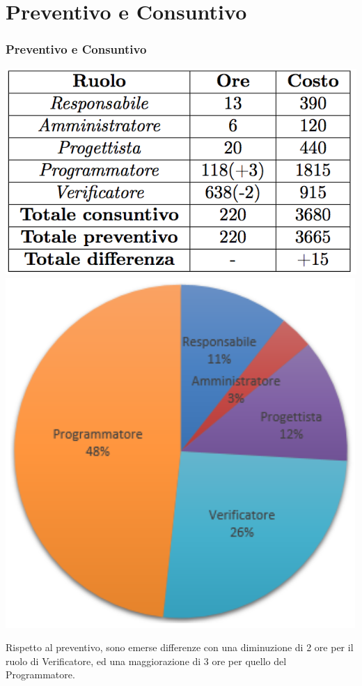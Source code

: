 \section{Preventivo e Consuntivo}
\begin{frame}
  \frametitle{Preventivo e Consuntivo}
  \begin{center}
  	\includegraphics[scale=0.5]{img/prevCD}
  	\includegraphics[scale=0.4]{img/cakeCD}
  \end{center}
Rispetto al preventivo, sono emerse differenze con una diminuzione di 2 ore per il ruolo di Verificatore, ed una maggiorazione di 3 ore per quello del Programmatore.
\end{frame}

